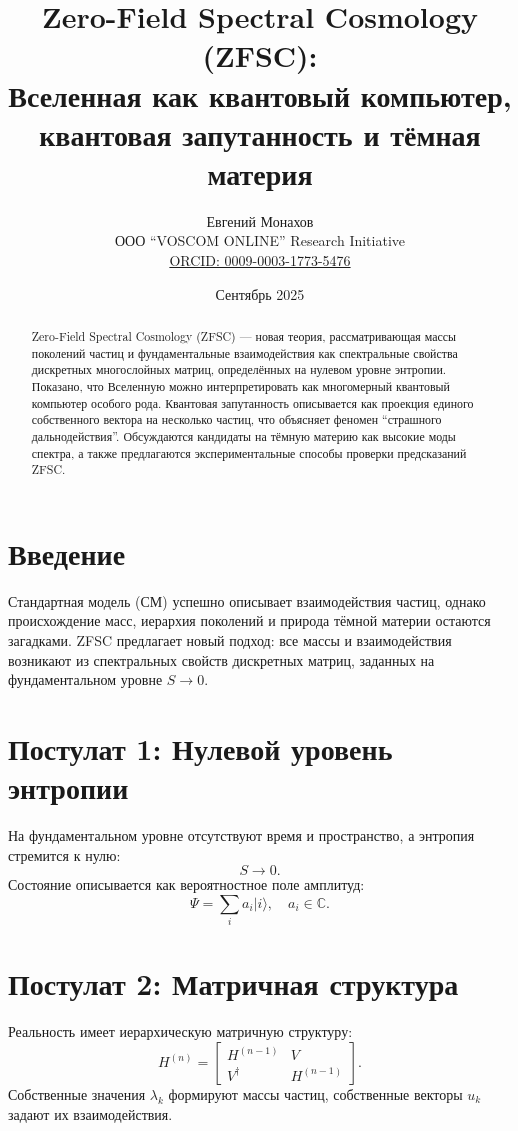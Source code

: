 \documentclass[12pt,a4paper]{article}
\title{Zero-Field Spectral Cosmology (ZFSC): \\
Вселенная как квантовый компьютер, квантовая запутанность и тёмная материя}
\author{Евгений Монахов \\
ООО ``VOSCOM ONLINE'' Research Initiative \\
\href{https://orcid.org/0009-0003-1773-5476}{ORCID: 0009-0003-1773-5476}}
\date{Сентябрь 2025}
\begin{document}
\maketitle

\begin{abstract}
Zero-Field Spectral Cosmology (ZFSC) --- новая теория, рассматривающая массы поколений частиц и фундаментальные взаимодействия как спектральные свойства дискретных многослойных матриц, определённых на нулевом уровне энтропии. 
Показано, что Вселенную можно интерпретировать как многомерный квантовый компьютер особого рода. 
Квантовая запутанность описывается как проекция единого собственного вектора на несколько частиц, что объясняет феномен ``страшного дальнодействия''. 
Обсуждаются кандидаты на тёмную материю как высокие моды спектра, а также предлагаются экспериментальные способы проверки предсказаний ZFSC.
\end{abstract}

\section{Введение}
Стандартная модель (СМ) успешно описывает взаимодействия частиц, однако происхождение масс, иерархия поколений и природа тёмной материи остаются загадками. 
ZFSC предлагает новый подход: все массы и взаимодействия возникают из спектральных свойств дискретных матриц, заданных на фундаментальном уровне $S \to 0$.

\section{Постулат 1: Нулевой уровень энтропии}
На фундаментальном уровне отсутствуют время и пространство, а энтропия стремится к нулю:
\[
S \to 0.
\]
Состояние описывается как вероятностное поле амплитуд:
\[
\Psi = \sum_{i} a_i |i\rangle, \quad a_i \in \mathbb{C}.
\]

\section{Постулат 2: Матричная структура}
Реальность имеет иерархическую матричную структуру:
\[
H^{(n)} =
\begin{bmatrix}
H^{(n-1)} & V \\
V^\dagger & H^{(n-1)}
\end{bmatrix}.
\]
Собственные значения $\lambda_k$ формируют массы частиц, собственные векторы $u_k$ задают их взаимодействия.
\end{document}
